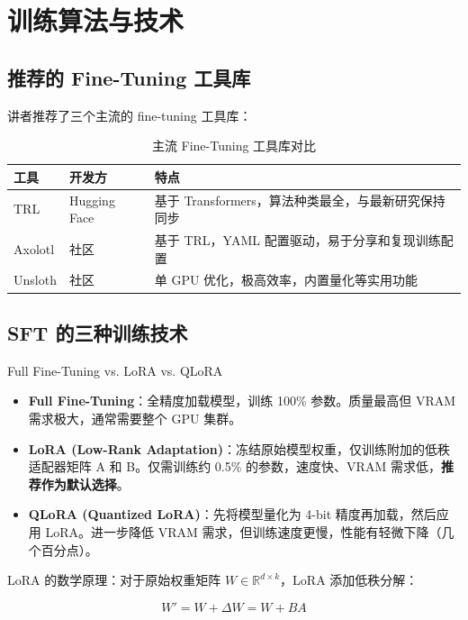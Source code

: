 \section{训练算法与技术}

\subsection{推荐的 Fine-Tuning 工具库}

讲者推荐了三个主流的 fine-tuning 工具库：

\begin{table}[H]
\centering
\caption{主流 Fine-Tuning 工具库对比}
\begin{tabular}{llp{7cm}}
\toprule
\textbf{工具} & \textbf{开发方} & \textbf{特点} \\
\midrule
TRL & Hugging Face & 基于 Transformers，算法种类最全，与最新研究保持同步 \\
Axolotl & 社区 & 基于 TRL，YAML 配置驱动，易于分享和复现训练配置 \\
Unsloth & 社区 & 单 GPU 优化，极高效率，内置量化等实用功能 \\
\bottomrule
\end{tabular}
\end{table}

\subsection{SFT 的三种训练技术}

\begin{importantbox}{Full Fine-Tuning vs. LoRA vs. QLoRA}
\begin{itemize}
    \item \textbf{Full Fine-Tuning}：全精度加载模型，训练 100\% 参数。质量最高但 VRAM 需求极大，通常需要整个 GPU 集群。
    \item \textbf{LoRA (Low-Rank Adaptation)}：冻结原始模型权重，仅训练附加的低秩适配器矩阵 A 和 B。仅需训练约 0.5\% 的参数，速度快、VRAM 需求低，\textbf{推荐作为默认选择}。
    \item \textbf{QLoRA (Quantized LoRA)}：先将模型量化为 4-bit 精度再加载，然后应用 LoRA。进一步降低 VRAM 需求，但训练速度更慢，性能有轻微下降（几个百分点）。
\end{itemize}
\end{importantbox}

LoRA 的数学原理：对于原始权重矩阵 $W \in \mathbb{R}^{d \times k}$，LoRA 添加低秩分解：

$$W' = W + \Delta W = W + BA$$

